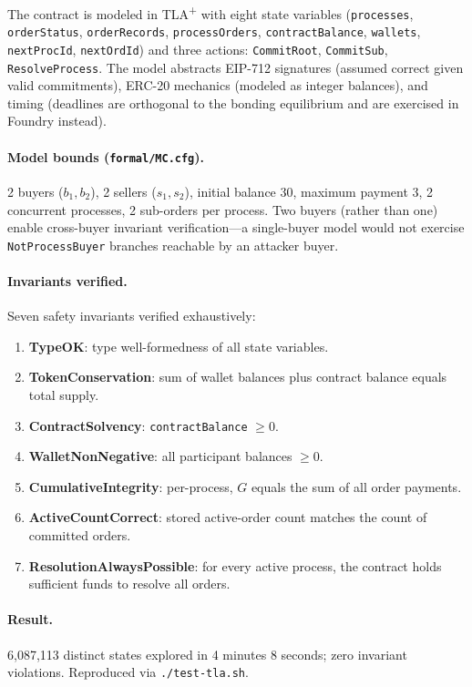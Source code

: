 \documentclass[11pt,a4paper]{article}
\theoremstyle{definition}
\theoremstyle{remark}
\newcommand{\cumval}{G}
\begin{document}
The contract is modeled in TLA\textsuperscript{+} with eight state
variables (\texttt{processes}, \texttt{orderStatus},
\texttt{orderRecords}, \texttt{processOrders},
\texttt{contractBalance}, \texttt{wallets}, \texttt{nextProcId},
\texttt{nextOrdId}) and three actions: \texttt{CommitRoot},
\texttt{CommitSub}, \texttt{ResolveProcess}. The model abstracts
EIP-712 signatures (assumed correct given valid commitments), ERC-20
mechanics (modeled as integer balances), and timing (deadlines are
orthogonal to the bonding equilibrium and are exercised in Foundry
instead).

\paragraph{Model bounds (\texttt{formal/MC.cfg}).}
2 buyers ($b_1, b_2$), 2 sellers ($s_1, s_2$), initial balance 30,
maximum payment 3, 2 concurrent processes, 2 sub-orders per process.
Two buyers (rather than one) enable cross-buyer invariant
verification---a single-buyer model would not exercise
\texttt{NotProcessBuyer} branches reachable by an attacker buyer.

\paragraph{Invariants verified.}
Seven safety invariants verified exhaustively:
\begin{enumerate}[label=\textbf{I\arabic*}]
  \item \textbf{TypeOK}: type well-formedness of all state variables.
  \item \textbf{TokenConservation}: sum of wallet balances plus
    contract balance equals total supply.
  \item \textbf{ContractSolvency}: \texttt{contractBalance} $\geq 0$.
  \item \textbf{WalletNonNegative}: all participant balances $\geq 0$.
  \item \textbf{CumulativeIntegrity}: per-process,
    $\cumval$ equals the sum of all order payments.
  \item \textbf{ActiveCountCorrect}: stored active-order count
    matches the count of committed orders.
  \item \textbf{ResolutionAlwaysPossible}: for every active process,
    the contract holds sufficient funds to resolve all orders.
\end{enumerate}

\paragraph{Result.}
6{,}087{,}113 distinct states explored in 4 minutes 8 seconds; zero
invariant violations. Reproduced via \texttt{./test-tla.sh}.
\end{document}
